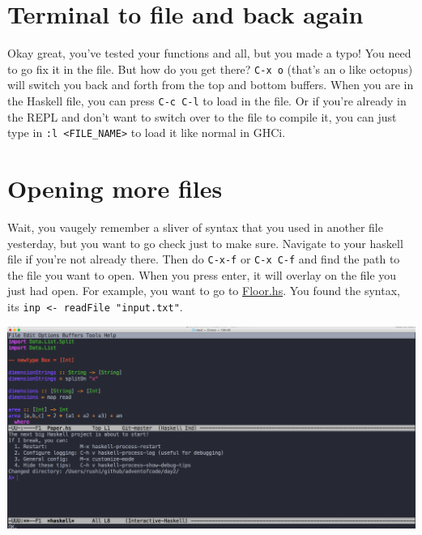 \documentclass[12pt]{article}
\begin{document}
\section{Terminal to file and back
again}\label{terminal-to-file-and-back-again}

Okay great, you've tested your functions and all, but you made a typo!
You need to go fix it in the file. But how do you get there?
\texttt{C-x\ o} (that's an o like octopus) will switch you back and
forth from the top and bottom buffers. When you are in the Haskell file,
you can press \texttt{C-c\ C-l} to load in the file. Or if you're
already in the REPL and don't want to switch over to the file to compile
it, you can just type in
\texttt{:l\ \textless{}FILE\_NAME\textgreater{}} to load it like normal
in GHCi.

\section{Opening more files}\label{opening-more-files}

Wait, you vaugely remember a sliver of syntax that you used in another
file yesterday, but you want to go check just to make sure. Navigate to
your haskell file if you're not already there. Then do \texttt{C-x-f} or
\texttt{C-x\ C-f} and find the path to the file you want to open. When
you press enter, it will overlay on the file you just had open. For
example, you want to go to
\href{https://github.com/2016rshah/adventofcode/blob/master/day2/Paper.hs}{Floor.hs}.
You found the syntax, its
\texttt{inp\ \textless{}-\ readFile\ "input.txt"}.

\begin{center}
\includegraphics[width=7in]{four}
\end{center}
\end{document}
